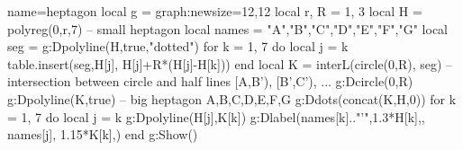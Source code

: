 \documentclass[12pt]{standalone}%
\begin{document}
\begin{luadraw}{name=heptagon}
local g = graph:new{size={12,12}}
local r, R = 1, 3
local H = polyreg(0,r,7) -- small heptagon
local names = {"A","B","C","D","E","F","G"}
local seg = {}
g:Dpolyline(H,true,"dotted")
for k = 1, 7 do
    local j = k%
    table.insert(seg,{H[j], H[j]+R*(H[j]-H[k])})
end
local K = interL(circle(0,R), seg) -- intersection between circle and half lines [A,B'), [B',C'), ...
g:Dcircle(0,R)
g:Dpolyline(K,true) -- big heptagon A,B,C,D,E,F,G
g:Ddots(concat(K,H,{0}))
for k = 1, 7 do
    local j = k%
    g:Dpolyline({H[j],K[k]})
    g:Dlabel(names[k].."'",1.3*H[k],{}, names[j], 1.15*K[k],{})
end
g:Show()
\end{luadraw}
\end{document}

